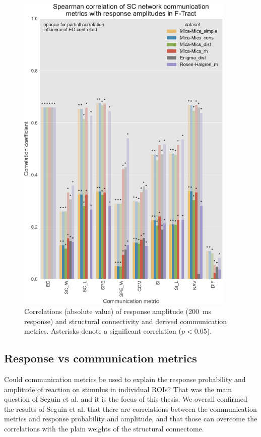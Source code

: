 \begin{figure}
    \centering
    \includegraphics[width=0.93\textwidth]{images/nootebook_generated/ftract_results/MNI-HCP-MMP1/5/ED0/0.25/long/Spearman_correlation_of_SC_network_communication_metrics_with_response_amplitudes_in_F-Tract.pdf}
    \caption[F-TRACT amplitude correlations - all $SC$ matrices]{Correlations (absolute value) of response amplitude (200~ms response) and structural connectivity and derived communication metrics. Asterisks denote a significant correlation ($p<0.05$).}
    \label{fig:ftract_alldata_long_amplitudes}
\end{figure}


\subsection{Response vs communication metrics}

Could communication metrics be used to explain the response probability and amplitude of reaction on stimulus in individual ROIs? That was the main question of Seguin et al. \cite{seguin_communication_2023} and it is the focus of this thesis. We overall confirmed the results of Seguin et al. that there are correlations between the communication metrics and response probability and amplitude, and that those can overcome the correlations with the plain weights of the structural connectome. 

